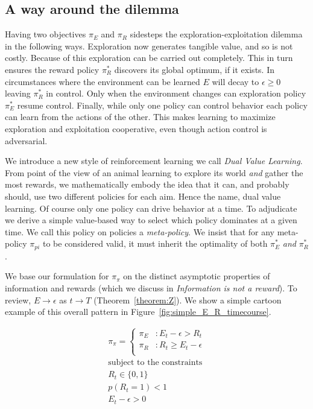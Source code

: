 \documentclass[9pt,twocolumn,twoside]{pnas-new}
\begin{document}
\subsection*{A way around the dilemma}
Having two objectives $\pi_E$ and $\pi_R$ sidesteps the exploration-exploitation dilemma in the following ways. Exploration now generates tangible value, and so is not costly. Because of this exploration can be carried out completely. This in turn ensures the reward policy $\pi^*_R$ discovers its global optimum, if it exists. In circumstances where the environment can be learned $E$ will decay to $\epsilon \geq 0$ leaving $\pi^*_R$ in control. Only when the environment changes can exploration policy $\pi^*_E$ resume control. Finally, while only one policy can control behavior each policy can learn from the actions of the other. This makes learning to maximize exploration and exploitation cooperative, even though action control is adversarial. 

We introduce a new style of reinforcement learning we call \textit{Dual Value Learning}. From point of the view of an animal learning to explore its world \textit{and} gather the most rewards, we mathematically embody the idea that it can, and probably should, use two different policies for each aim. Hence the name, dual value learning. Of course only one policy can drive behavior at a time. To adjudicate we derive a simple value-based way %
 to select which policy dominates at a given time. We call this policy on policies a \textit{meta-policy}. We insist that for any meta-policy $\pi_{pi}$ to be considered valid, it must inherit the optimality of both $\pi^*_E$ \textit{and} $\pi^*_R$. 
 
 We base our formulation for $\pi_{\pi}$ on the distinct asymptotic properties of information and rewards (which we discuss in \textit{Information is not a reward}). To review, $E \rightarrow \epsilon$ as $t \rightarrow T$ (Theorem~\ref{theorem:Z}). We show a simple cartoon example of this overall pattern in Figure~\ref{fig:simple_E_R_timecourse}.

\begin{equation} \label{eq:meta_greedy}
    \begin{split}
        \pi_{\pi} = 
        \begin{cases}
            \pi_E & : E_t - \epsilon > R_t \\
            \pi_R & : R_t \geq E_t - \epsilon \\
        \end{cases}\\
        \text{subject to the constraints}\\
        R_t \in \{0, 1\}\\ 
        p(R_t = 1) < 1\\
        E_t - \epsilon > 0
    \end{split}
\end{equation}
\end{document}
